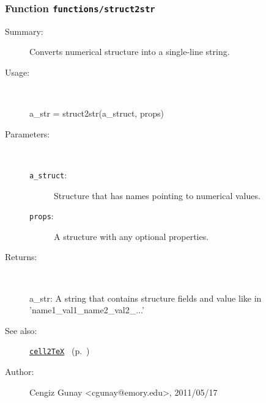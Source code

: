 \subsubsection[Function \texttt{struct2str}]{Function \texttt{functions/struct2str}}%
%
\label{ref_functions__struct2str}%
\hypertarget{ref_functions__struct2str}{}%
\begin{description}
\item[Summary:]Converts numerical structure into a single-line string.
%
\item[Usage:]~%
\begin{lyxcode}%
a\_str = struct2str(a\_struct, props)
%
\end{lyxcode}%
%
%
\item[Parameters:]~
\begin{description}%
\item[\texttt{a\_struct}:]
 Structure that has names pointing to numerical values.
\item[\texttt{props}:]
 A structure with any optional properties.
\end{description}%
%
\item[Returns:
]~

   a\_str: A string that contains structure fields and value like in 'name1\_val1\_name2\_val2\_...'
%
%
\item[See also:]%
\hyperlink{ref_cell2TeX}{\texttt{cell2TeX}}%
\ (p.~\pageref{ref_cell2TeX})%
%
%
\item[Author:]%
Cengiz Gunay <cgunay@emory.edu>, 2011/05/17
%
\end{description}
\methodline%
